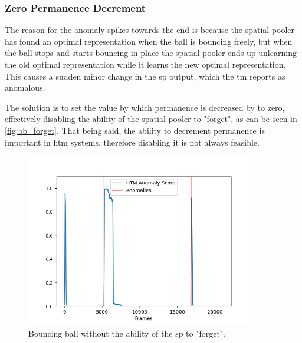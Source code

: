 \subsubsection{Zero Permanence Decrement}
The reason for the anomaly spikes towards the end is because the spatial pooler has found an optimal representation when the ball is bouncing freely, but when the ball stops and starts bouncing in-place the spatial pooler ends up unlearning the old optimal representation while it learns the new optimal representation. This causes a sudden minor change in the \gls*{sp} output, which the \gls*{tm} reports as anomalous.
\par
The solution is to set the value by which permanence is decreased by to zero, effectively disabling the ability of the spatial pooler to "forget", as can be seen in \autoref{fig:bb_forget}. That being said, the ability to decrement permanence is important in \gls*{htm} systems, therefore disabling it is not always feasible.
\begin{figure}[H]
    \centering
    \includegraphics[width=0.9\textwidth]{resources/experiments/bouncing_ball/bb_anoms_unforgetting.png}
    \caption[Bouncing Ball Experiment Anomaly Score Zero Decrement]{Bouncing ball without the ability of the \gls*{sp} to "forget".}
    \label{fig:bb_forget}
\end{figure}

